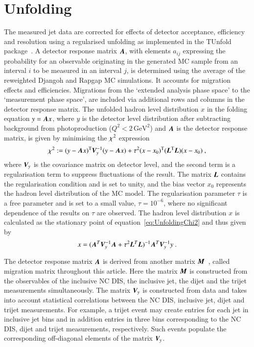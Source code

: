 \documentclass[12pt]{article}
\begin{document}


\section{Unfolding} 
\label{sect:unfolding}
The measured jet data are corrected for effects of detector acceptance, efficiency and resolution using a regularised unfolding as implemented in the TUnfold package~\cite{unfold}.
A detector response matrix $\A$, with elements $a_{ij}$ expressing the probability for an observable 
originating in the generated MC sample from an interval $i$ to be measured in an interval $j$, is 
determined using the average of the reweighted Djangoh and Rapgap MC simulations. 
It accounts for migration effects and efficiencies.
Migrations from the `extended analysis phase space' to the `measurement phase space',
 are included via additional rows and columns in the detector response matrix.
The unfolded hadron level distribution $x$ in the folding equation $y=\A x$, where $y$ is 
the detector level distribution after subtracting
background from photoproduction ($Q^2<2\,\text{GeV}^2$) and $\A$ is the detector response matrix, is given by minimising %
the $\chisq$ expression 
\begin{equation}
\chisq  := (y - \A x)^{\rm T} \V_y^{-1} (y-\A x) +  \tau^2 (x-x_0)^{\rm T}({\LL}^{\rm T}{\LL})(x-x_0)~,
\label{eq:UnfoldingChi2}
\end{equation}
where $\V_y$ is the covariance matrix on detector level, and the second term is a regularisation term to suppress fluctuations of the result.
The matrix ${\LL}$ contains the regularisation condition and is set to unity, and the bias vector $x_0$ represents the 
hadron level distribution of the MC model.
The regularisation parameter $\tau$ is a free parameter and is set to a small value, $\tau=10^{-6}$, where no significant dependence of the results on $\tau$ are observed.
The hadron level distribution $x$ is calculated as the stationary point of equation~\ref{eq:UnfoldingChi2} and thus given by
\begin{equation}
  x = (\A^T\V_y^{-1}\A+\tau^2{\LL}^T\LL)^{-1} \A^T\V_y^{-1}y~.
  \label{eq:UnfoldingX}
\end{equation}


The detector response matrix $\A$ is derived from another matrix ${\M}$~\cite{unfold},
called migration matrix throughout this article.
Here the matrix ${\M}$ is constructed from the observables of the inclusive NC DIS, the inclusive jet, the dijet and the trijet measurements simultaneously. 
The matrix $\V_y$ is constructed from data and takes into 
 account statistical correlations between the NC DIS, inclusive jet, 
 dijet and trijet measurements. 
For example, a trijet event may 
 create entries for each jet in inclusive jet bins and in 
 addition entries in three bins corresponding to the NC DIS, 
 dijet and trijet measurements, respectively. 
Such events populate  the corresponding off-diagonal elements of the matrix $\V_y$. 
\end{document}
